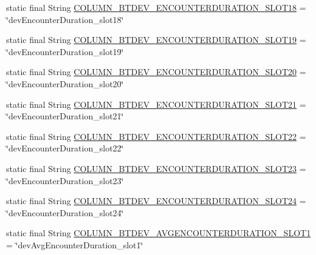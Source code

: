 \begin{DoxyCompactItemize}
\item 
static final String \hyperlink{classcom_1_1social_1_1proximity_1_1_s_q_lite_helper_a31c1917e141416f90f40b134635332ac}{C\+O\+L\+U\+M\+N\+\_\+\+B\+T\+D\+E\+V\+\_\+\+E\+N\+C\+O\+U\+N\+T\+E\+R\+D\+U\+R\+A\+T\+I\+O\+N\+\_\+\+S\+L\+O\+T18} = \char`\"{}dev\+Encounter\+Duration\+\_\+slot18\char`\"{}
\item 
static final String \hyperlink{classcom_1_1social_1_1proximity_1_1_s_q_lite_helper_a7566bf6b0339022bbd22a2bf01c491ed}{C\+O\+L\+U\+M\+N\+\_\+\+B\+T\+D\+E\+V\+\_\+\+E\+N\+C\+O\+U\+N\+T\+E\+R\+D\+U\+R\+A\+T\+I\+O\+N\+\_\+\+S\+L\+O\+T19} = \char`\"{}dev\+Encounter\+Duration\+\_\+slot19\char`\"{}
\item 
static final String \hyperlink{classcom_1_1social_1_1proximity_1_1_s_q_lite_helper_a30462676920857a1e2532cccab8ec3c4}{C\+O\+L\+U\+M\+N\+\_\+\+B\+T\+D\+E\+V\+\_\+\+E\+N\+C\+O\+U\+N\+T\+E\+R\+D\+U\+R\+A\+T\+I\+O\+N\+\_\+\+S\+L\+O\+T20} = \char`\"{}dev\+Encounter\+Duration\+\_\+slot20\char`\"{}
\item 
static final String \hyperlink{classcom_1_1social_1_1proximity_1_1_s_q_lite_helper_ac6c1e28fea294c28cbd5523f8b606f96}{C\+O\+L\+U\+M\+N\+\_\+\+B\+T\+D\+E\+V\+\_\+\+E\+N\+C\+O\+U\+N\+T\+E\+R\+D\+U\+R\+A\+T\+I\+O\+N\+\_\+\+S\+L\+O\+T21} = \char`\"{}dev\+Encounter\+Duration\+\_\+slot21\char`\"{}
\item 
static final String \hyperlink{classcom_1_1social_1_1proximity_1_1_s_q_lite_helper_a2d60f22417a7633262ad4a042ab98d96}{C\+O\+L\+U\+M\+N\+\_\+\+B\+T\+D\+E\+V\+\_\+\+E\+N\+C\+O\+U\+N\+T\+E\+R\+D\+U\+R\+A\+T\+I\+O\+N\+\_\+\+S\+L\+O\+T22} = \char`\"{}dev\+Encounter\+Duration\+\_\+slot22\char`\"{}
\item 
static final String \hyperlink{classcom_1_1social_1_1proximity_1_1_s_q_lite_helper_a37c71effb88d2a7da8cfe2301ea5b777}{C\+O\+L\+U\+M\+N\+\_\+\+B\+T\+D\+E\+V\+\_\+\+E\+N\+C\+O\+U\+N\+T\+E\+R\+D\+U\+R\+A\+T\+I\+O\+N\+\_\+\+S\+L\+O\+T23} = \char`\"{}dev\+Encounter\+Duration\+\_\+slot23\char`\"{}
\item 
static final String \hyperlink{classcom_1_1social_1_1proximity_1_1_s_q_lite_helper_ac314cf6fbe854832579bf6de4bcb17f0}{C\+O\+L\+U\+M\+N\+\_\+\+B\+T\+D\+E\+V\+\_\+\+E\+N\+C\+O\+U\+N\+T\+E\+R\+D\+U\+R\+A\+T\+I\+O\+N\+\_\+\+S\+L\+O\+T24} = \char`\"{}dev\+Encounter\+Duration\+\_\+slot24\char`\"{}
\item 
static final String \hyperlink{classcom_1_1social_1_1proximity_1_1_s_q_lite_helper_a3b3e9cdce16dfd979199820bb685a105}{C\+O\+L\+U\+M\+N\+\_\+\+B\+T\+D\+E\+V\+\_\+\+A\+V\+G\+E\+N\+C\+O\+U\+N\+T\+E\+R\+D\+U\+R\+A\+T\+I\+O\+N\+\_\+\+S\+L\+O\+T1} = \char`\"{}dev\+Avg\+Encounter\+Duration\+\_\+slot1\char`\"{}

\end{DoxyCompactItemize}
